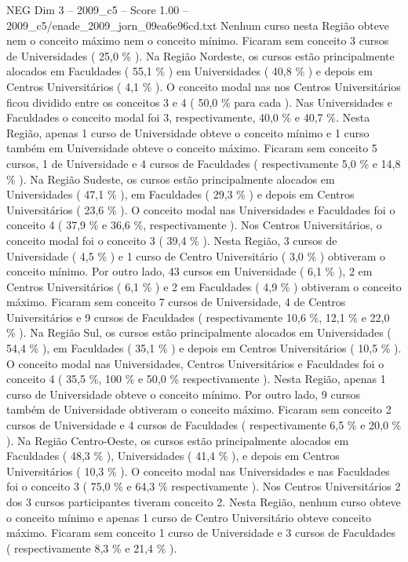 \begin{textsample}{NEG Dim 3 – 2009\_c5 – Score 1.00 – 2009\_c5/enade\_2009\_jorn\_09ea6e96cd.txt}
Nenhum curso nesta Região obteve nem o conceito máximo nem o conceito mínimo.
Ficaram sem conceito 3 cursos de Universidades ( 25,0 \% ).
Na Região Nordeste, os cursos estão principalmente alocados em Faculdades ( 55,1 \% ) em Universidades ( 40,8 \% ) e depois em Centros Universitários ( 4,1 \% ).
O conceito modal nas nos Centros Universitários ficou dividido entre os conceitos 3 e 4 ( 50,0 \% para cada ).
Nas Universidades e Faculdades o conceito modal foi 3, respectivamente, 40,0 \% e 40,7 \%.
Nesta Região, apenas 1 curso de Universidade obteve o conceito mínimo e 1 curso também em Universidade obteve o conceito máximo.
Ficaram sem conceito 5 cursos, 1 de Universidade e 4 cursos de Faculdades ( respectivamente 5,0 \% e 14,8 \% ).
Na Região Sudeste, os cursos estão principalmente alocados em Universidades ( 47,1 \% ), em Faculdades ( 29,3 \% ) e depois em Centros Universitários ( 23,6 \% ).
O conceito modal nas Universidades e Faculdades foi o conceito 4 ( 37,9 \% e 36,6 \%, respectivamente ).
Nos Centros Universitários, o conceito modal foi o conceito 3 ( 39,4 \% ).
Nesta Região, 3 cursos de Universidade ( 4,5 \% ) e 1 curso de Centro Universitário ( 3,0 \% ) obtiveram o conceito mínimo.
Por outro lado, 43 cursos em Universidade ( 6,1 \% ), 2 em Centros Universitários ( 6,1 \% ) e 2 em Faculdades ( 4,9 \% ) obtiveram o conceito máximo.
Ficaram sem conceito 7 cursos de Universidade, 4 de Centros Universitários e 9 cursos de Faculdades ( respectivamente 10,6 \%, 12,1 \% e 22,0 \% ).
Na Região Sul, os cursos estão principalmente alocados em Universidades ( 54,4 \% ), em Faculdades ( 35,1 \% ) e depois em Centros Universitários ( 10,5 \% ).
O conceito modal nas Universidades, Centros Universitários e Faculdades foi o conceito 4 ( 35,5 \%, 100 \% e 50,0 \% respectivamente ).
Nesta Região, apenas 1 curso de Universidade obteve o conceito mínimo.
Por outro lado, 9 cursos também de Universidade obtiveram o conceito máximo.
Ficaram sem conceito 2 cursos de Universidade e 4 cursos de Faculdades ( respectivamente 6,5 \% e 20,0 \% ).
Na Região Centro-Oeste, os cursos estão principalmente alocados em Faculdades ( 48,3 \% ), Universidades ( 41,4 \% ), e depois em Centros Universitários ( 10,3 \% ).
O conceito modal nas Universidades e nas Faculdades foi o conceito 3 ( 75,0 \% e 64,3 \% respectivamente ).
Nos Centros Universitários 2 dos 3 cursos participantes tiveram conceito 2.
Nesta Região, nenhum curso obteve o conceito mínimo e apenas 1 curso de Centro Universitário obteve conceito máximo.
Ficaram sem conceito 1 curso de Universidade e 3 cursos de Faculdades ( respectivamente 8,3 \% e 21,4 \% ).

\end{textsample}
